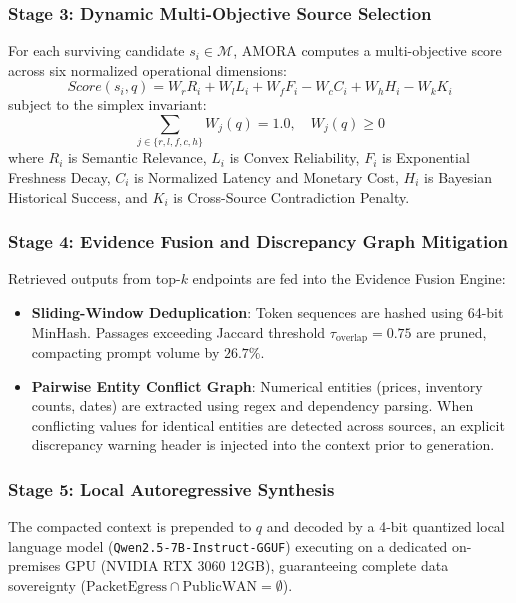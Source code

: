 \documentclass[fleqn,10pt]{article}
\begin{document}
\subsubsection{Stage 3: Dynamic Multi-Objective Source Selection}
For each surviving candidate $s_i \in \mathcal{M}$, AMORA computes a multi-objective score across six normalized operational dimensions:
\begin{equation}
Score(s_i, q) = W_r R_i + W_l L_i + W_f F_i - W_c C_i + W_h H_i - W_k K_i
\label{eq:scoring}
\end{equation}
subject to the simplex invariant:
\begin{equation}
\sum_{j \in \{r, l, f, c, h\}} W_j(q) = 1.0, \quad W_j(q) \ge 0
\label{eq:simplex}
\end{equation}
where $R_i$ is Semantic Relevance, $L_i$ is Convex Reliability, $F_i$ is Exponential Freshness Decay, $C_i$ is Normalized Latency and Monetary Cost, $H_i$ is Bayesian Historical Success, and $K_i$ is Cross-Source Contradiction Penalty.

\subsubsection{Stage 4: Evidence Fusion and Discrepancy Graph Mitigation}
Retrieved outputs from top-$k$ endpoints are fed into the Evidence Fusion Engine:
\begin{itemize}[leftmargin=1.5em]
    \item \textbf{Sliding-Window Deduplication}: Token sequences are hashed using 64-bit MinHash. Passages exceeding Jaccard threshold $\tau_{\text{overlap}} = 0.75$ are pruned, compacting prompt volume by $26.7\%$.
    \item \textbf{Pairwise Entity Conflict Graph}: Numerical entities (prices, inventory counts, dates) are extracted using regex and dependency parsing. When conflicting values for identical entities are detected across sources, an explicit discrepancy warning header is injected into the context prior to generation.
\end{itemize}

\subsubsection{Stage 5: Local Autoregressive Synthesis}
The compacted context is prepended to $q$ and decoded by a 4-bit quantized local language model (\texttt{Qwen2.5-7B-Instruct-GGUF}) executing on a dedicated on-premises GPU (NVIDIA RTX 3060 12GB), guaranteeing complete data sovereignty ($\text{PacketEgress} \cap \text{PublicWAN} = \emptyset$).
\end{document}
